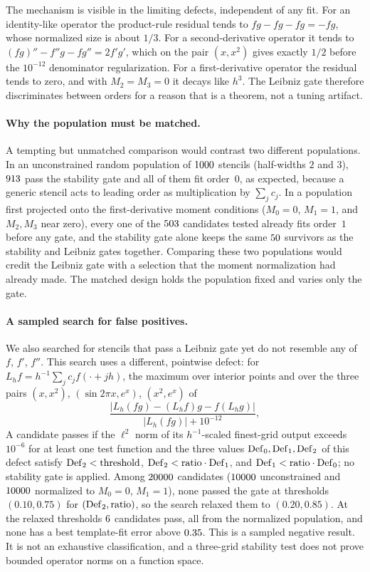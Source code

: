 The mechanism is visible in the limiting defects, independent of any fit.
For an identity-like operator the product-rule residual tends to $fg-fg-fg=-fg$, whose normalized size is about $1/3$.
For a second-derivative operator it tends to $(fg)''-f''g-fg''=2f'g'$, which on the pair $(x,x^2)$ gives exactly $1/2$ before the $10^{-12}$ denominator regularization.
For a first-derivative operator the residual tends to zero, and with $M_2=M_3=0$ it decays like $h^3$.
The Leibniz gate therefore discriminates between orders for a reason that is a theorem, not a tuning artifact.

\paragraph{Why the population must be matched.}
A tempting but unmatched comparison would contrast two different populations.
In an unconstrained random population of $1000$ stencils (half-widths $2$ and $3$), $913$ pass the stability gate and all of them fit order~$0$, as expected, because a generic stencil acts to leading order as multiplication by $\sum_jc_j$.
In a population first projected onto the first-derivative moment conditions ($M_0=0$, $M_1=1$, and $M_2,M_3$ near zero), every one of the $503$ candidates tested already fits order~$1$ before any gate, and the stability gate alone keeps the same $50$ survivors as the stability and Leibniz gates together.
Comparing these two populations would credit the Leibniz gate with a selection that the moment normalization had already made.
The matched design holds the population fixed and varies only the gate.

\paragraph{A sampled search for false positives.}
We also searched for stencils that pass a Leibniz gate yet do not resemble any of $f$, $f'$, $f''$.
This search uses a different, pointwise defect: for $L_hf=h^{-1}\sum_jc_jf(\cdot+jh)$, the maximum over interior points and over the three pairs $(x,x^2)$, $(\sin 2\pi x,e^x)$, $(x^2,e^x)$ of
\[
  \frac{|L_h(fg)-(L_hf)g-f(L_hg)|}{|L_h(fg)|+10^{-12}},
\]
A candidate passes if the $\ell^2$ norm of its $h^{-1}$-scaled finest-grid output exceeds $10^{-6}$ for at least one test function and the three values $\mathrm{Def}_0,\mathrm{Def}_1,\mathrm{Def}_2$ of this defect satisfy $\mathrm{Def}_2<\text{threshold}$, $\mathrm{Def}_2<\text{ratio}\cdot\mathrm{Def}_1$, and $\mathrm{Def}_1<\text{ratio}\cdot\mathrm{Def}_0$; no stability gate is applied.
Among $20000$ candidates ($10000$ unconstrained and $10000$ normalized to $M_0=0$, $M_1=1$), none passed the gate at thresholds $(0.10,0.75)$ for $(\mathrm{Def}_2,\text{ratio})$, so the search relaxed them to $(0.20,0.85)$.
At the relaxed thresholds $6$ candidates pass, all from the normalized population, and none has a best template-fit error above $0.35$.
This is a sampled negative result.
It is not an exhaustive classification, and a three-grid stability test does not prove bounded operator norms on a function space.

